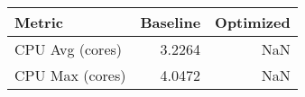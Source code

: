 \begin{tabular}{lrr}
\toprule
Metric & Baseline & Optimized \\
\midrule
CPU Avg (cores) & 3.2264 & NaN \\
CPU Max (cores) & 4.0472 & NaN \\
\bottomrule
\end{tabular}
